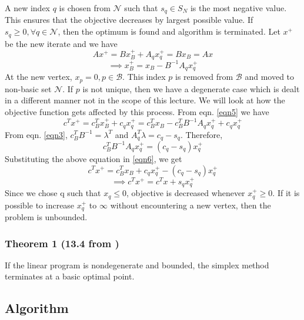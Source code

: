 \documentclass[12pt,letterpaper]{article}
\begin{document}
A new index $q$ is chosen from $\mathcal{N}$ such that $s_q \in S_N$ is the most negative value. This ensures that the objective decreases by largest possible value. If $s_q \geq 0, \forall q \in \mathcal{N}$, then the optimum is found and algorithm is terminated. Let $x^+$ be the new iterate and we have
\begin{equation*}
Ax^+ = Bx^+_B + A_qx^+_q = Bx_B = Ax
\end{equation*}
\begin{equation}
\implies x^+_B = x_B - B^{-1}A_qx^+_q
\label{eqn5}
\end{equation}
At the new vertex, $x_p = 0, p \in \mathcal{B}$. This index $p$ is removed from $\mathcal{B}$ and moved to non-basic set $\mathcal{N}$. If $p$ is not unique, then we have a degenerate case which is dealt in a different manner not in the scope of this lecture. We will look at how the objective function gets affected by this process. From eqn. \ref{eqn5} we have
\begin{equation}
c^Tx^+ = c^T_Bx^+_B + c_qx^+_q = c^T_Bx_B - c^T_BB^{-1}A_qx^+_q + c_qx^+_q
\label{eqn6}
\end{equation}
From eqn. \ref{eqn3}, $c^T_BB^{-1} = \lambda^T$ and $A^T_q\lambda = c_q - s_q$. Therefore,
\begin{equation*}
c^T_BB^{-1}A_qx^+_q = (c_q - s_q)x^+_q
\end{equation*}
Substituting the above equation in \ref{eqn6}, we get
\begin{equation*}
c^Tx^+ = c^T_Bx_B + c_qx^+_q - (c_q - s_q)x^+_q
\end{equation*}
\begin{equation}
\implies c^Tx^+ = c^Tx + s_qx^+_q
\label{eqn7}
\end{equation}
Since we chose q such that $x_q \le 0$, objective is decreased whenever $x^+_q \ge 0$. If it is possible to increase $x^+_q$ to $\infty$ without encountering a new vertex, then the problem is unbounded.

\subsubsection*{Theorem 1 (13.4 from \cite{nocedal2006numerical})} 
If the linear program is nondegenerate and bounded, the simplex method terminates at a basic optimal point.

\subsection{Algorithm}
\end{document}
